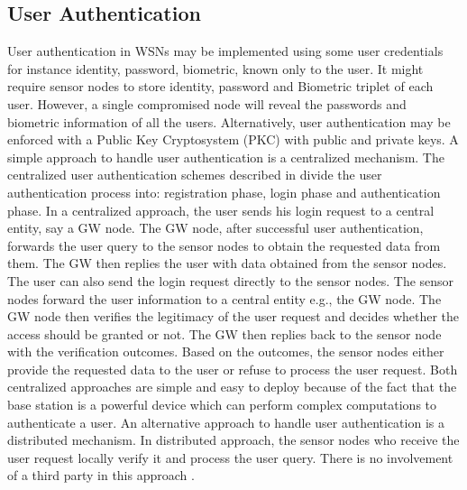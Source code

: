 \documentclass[a4paper,12pt]{report}
\begin{document}
\subsection{User Authentication}
User authentication in WSNs may be implemented using some user
credentials for instance identity, password, biometric, known only
to the user. It might require sensor nodes to store identity,
password and Biometric triplet of each user. However, a single
compromised node will reveal the passwords and biometric information
of all the users. Alternatively, user authentication may be enforced
with a Public Key Cryptosystem (PKC) with public and private keys. A
simple approach to handle user authentication is a centralized
mechanism. The centralized user authentication schemes described in
\cite{wong,tseng,das,lee2008} divide the user authentication
process into: registration phase, login phase and authentication
phase. In a centralized approach, the user sends his login request
to a central entity, say a GW node. The GW node, after successful
user authentication, forwards the user query to the sensor nodes to
obtain the requested data from them. The GW then replies the user
with data obtained from the sensor nodes. The user can also send the
login request directly to the sensor nodes. The sensor nodes forward
the user information to a central entity e.g., the GW node. The GW
node then verifies the legitimacy of the user request and decides
whether the access should be granted or not. The GW then replies
back to the sensor node with the verification outcomes. Based on the
outcomes, the sensor nodes either provide the requested data to the
user or refuse to process the user request. Both centralized
approaches are simple and easy to deploy because of the fact that
the base station is a powerful device which can perform complex
computations to authenticate a user. An alternative approach to
handle user authentication is a distributed mechanism. In
distributed approach, the sensor nodes who receive the user request
locally verify it and process the user query. There is no
involvement of a third party in this approach \cite{yasmin}.\\
\end{document}
